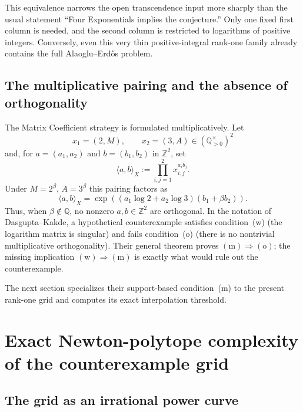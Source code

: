 \documentclass[11pt,oneside]{article}
\theoremstyle{definition}
\theoremstyle{remark}
\newcommand{\Z}{\mathbb Z}
\newcommand{\Q}{\mathbb Q}
\begin{document}
This equivalence narrows the open transcendence input more sharply than the usual statement
``Four Exponentials implies the conjecture.''  Only one fixed first column is needed, and the
second column is restricted to logarithms of positive integers.  Conversely, even this very
thin positive-integral rank-one family already contains the full Alaoglu--Erd\H{o}s problem.

\subsection{The multiplicative pairing and the absence of orthogonality}

The Matrix Coefficient strategy is formulated multiplicatively.  Let
\begin{equation}
 x_1=(2,M),\qquad x_2=(3,A)\in(\Q_{>0}^{\times})^2
 \label{eq:mc-generators}
\end{equation}
and, for $a=(a_1,a_2)$ and $b=(b_1,b_2)$ in $\Z^2$, set
\begin{equation}
 \langle a,b\rangle_X
 :=\prod_{i,j=1}^{2}x_{i,j}^{a_i b_j}.
 \label{eq:mc-pairing}
\end{equation}
Under $M=2^\beta$, $A=3^\beta$ this pairing factors as
\begin{equation}
 \langle a,b\rangle_X
 =\exp\!\left(
   (a_1\log2+a_2\log3)(b_1+\beta b_2)
  \right).
 \label{eq:mc-pairing-factor}
\end{equation}
Thus, when $\beta\notin\Q$, no nonzero $a,b\in\Z^2$ are orthogonal.  In the notation of
Dasgupta--Kakde, a hypothetical counterexample satisfies condition~(w) (the logarithm matrix is
singular) and fails condition~(o) (there is no nontrivial multiplicative orthogonality).  Their
general theorem proves $(\mathrm m)\Rightarrow(\mathrm o)$; the missing implication
$(\mathrm w)\Rightarrow(\mathrm m)$ is exactly what would rule out the counterexample.

The next section specializes their support-based condition~(m) to the present rank-one grid and
computes its exact interpolation threshold.

\section{Exact Newton-polytope complexity of the counterexample grid}
\label{sec:newton-threshold}

\subsection{The grid as an irrational power curve}
\end{document}

